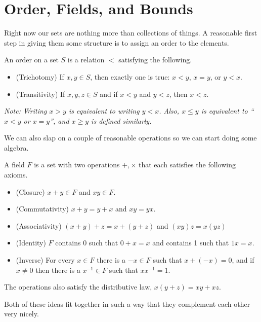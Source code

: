 \documentclass[../m131main.tex]{subfiles}
\begin{document}
\section{Order, Fields, and Bounds}
Right now our sets are nothing more than collections of things.
A reasonable first step in giving them some structure is to assign an order to the elements.

\begin{definition}[Order]
    An order on a set $S$ is a relation $<$ satisfying the following.
    \begin{itemize}
        \item (Trichotomy) If $x,y \in S$, then exactly one is true: $x < y$, $x = y$, or $y < x$.
        \item (Transitivity) If $x,y,z \in S$ and if $x < y$ and $y < z$, then $x < z$.
    \end{itemize}

    \medskip
    \textit{Note: Writing $x > y$ is equivalent to writing $y < x$.
    Also, $x \leq y$ is equivalent to ``$x < y$ or $x = y$'', and $x \geq y$ is defined similarly.}
\end{definition}

We can also slap on a couple of reasonable operations so we can start doing some algebra.

\begin{definition}[Field]
    A field $F$ is a set with two operations $+,\times$ that each satisfies the following axioms.
    \begin{itemize}
        \item (Closure) $x + y \in F$ and $xy \in F$.
        \item (Commutativity) $x + y = y + x$ and $xy = yx$.
        \item (Associativity) $(x + y) + z = x + (y + z)$ and $(xy)z = x(yz)$
        \item (Identity) $F$ contains 0 such that $0 + x = x$ and contains 1 such that $1x = x$.
        \item (Inverse) For every $x \in F$ there is a $-x \in F$ such that $x + (-x) = 0$, and if $x \neq 0$ then there is a $x^{-1} \in F$ such that $x x^{-1} = 1$.
    \end{itemize}
    The operations also satisfy the distributive law, $x(y + z) = xy + xz$.
\end{definition}

Both of these ideas fit together in such a way that they complement each other very nicely.
\end{document}
